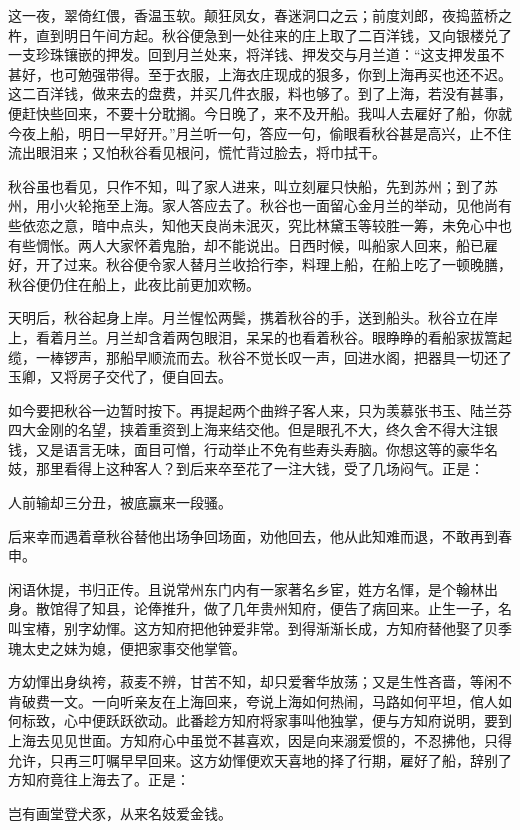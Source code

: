 \documentclass[12pt,UTF8]{ctexbook}
\begin{document}
{{{这一夜，翠倚红偎，香温玉软。颠狂凤女，春迷洞口之云；前度刘郎，夜捣蓝桥之杵，直到明日午间方起。秋谷便急到一处往来的庄上取了二百洋钱，又向银楼兑了一支珍珠镶嵌的押发。回到月兰处来，将洋钱、押发交与月兰道：“这支押发虽不甚好，也可勉强带得。至于衣服，上海衣庄现成的狠多，你到上海再买也还不迟。这二百洋钱，做来去的盘费，并买几件衣服，料也够了。到了上海，若没有甚事，便赶快些回来，不要十分耽搁。今日晚了，来不及开船。我叫人去雇好了船，你就今夜上船，明日一早好开。”月兰听一句，答应一句，偷眼看秋谷甚是高兴，止不住流出眼泪来；又怕秋谷看见根问，慌忙背过脸去，将巾拭干。

秋谷虽也看见，只作不知，叫了家人进来，叫立刻雇只快船，先到苏州；到了苏州，用小火轮拖至上海。家人答应去了。秋谷也一面留心金月兰的举动，见他尚有些依恋之意，暗中点头，知他天良尚未泯灭，究比林黛玉等较胜一筹，未免心中也有些惆怅。两人大家怀着鬼胎，却不能说出。日西时候，叫船家人回来，船已雇好，开了过来。秋谷便令家人替月兰收拾行李，料理上船，在船上吃了一顿晚膳，秋谷便仍住在船上，此夜比前更加欢畅。

天明后，秋谷起身上岸。月兰惺忪两鬓，携着秋谷的手，送到船头。秋谷立在岸上，看着月兰。月兰却含着两包眼泪，呆呆的也看着秋谷。眼睁睁的看船家拔篙起缆，一棒锣声，那船早顺流而去。秋谷不觉长叹一声，回进水阁，把器具一切还了玉卿，又将房子交代了，便自回去。

如今要把秋谷一边暂时按下。再提起两个曲辫子客人来，只为羡慕张书玉、陆兰芬四大金刚的名望，挟着重资到上海来结交他。但是眼孔不大，终久舍不得大注银钱，又是语言无味，面目可憎，行动举止不免有些寿头寿脑。你想这等的豪华名妓，那里看得上这种客人？到后来卒至花了一注大钱，受了几场闷气。正是：

人前输却三分丑，被底赢来一段骚。

后来幸而遇着章秋谷替他出场争回场面，劝他回去，他从此知难而退，不敢再到春申。

闲语休提，书归正传。且说常州东门内有一家著名乡宦，姓方名惲，是个翰林出身。散馆得了知县，论俸推升，做了几年贵州知府，便告了病回来。止生一子，名叫宝椿，别字幼惲。这方知府把他钟爱非常。到得渐渐长成，方知府替他娶了贝季瑰太史之妹为媳，便把家事交他掌管。

方幼惲出身纨袴，菽麦不辨，甘苦不知，却只爱奢华放荡；又是生性吝啬，等闲不肯破费一文。一向听亲友在上海回来，夸说上海如何热闹，马路如何平坦，倌人如何标致，心中便跃跃欲动。此番趁方知府将家事叫他独掌，便与方知府说明，要到上海去见见世面。方知府心中虽觉不甚喜欢，因是向来溺爱惯的，不忍拂他，只得允许，只再三叮嘱早早回来。这方幼惲便欢天喜地的择了行期，雇好了船，辞别了方知府竟往上海去了。正是：

岂有画堂登犬豕，从来名妓爱金钱。

}}}
\end{document}
